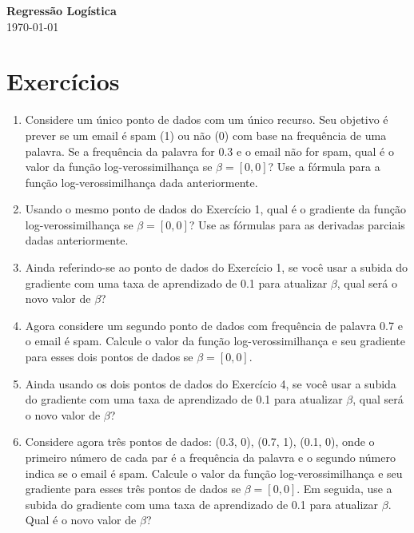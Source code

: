 \documentclass[12pt,a4paper, brazil]{article}
\begin{document}
\begin{center}
{\textbf {\huge Regressão Logística}}\\[5mm]
\today\\[5mm] %
\end{center}



\section{Exercícios}

\begin{enumerate}

\item Considere um único ponto de dados com um único recurso. Seu objetivo é prever se um email é spam (1) ou não (0) com base na frequência de uma palavra. Se a frequência da palavra for 0.3 e o email não for spam, qual é o valor da função log-verossimilhança se $\beta = [0, 0]$? Use a fórmula para a função log-verossimilhança dada anteriormente.

\item  Usando o mesmo ponto de dados do Exercício 1, qual é o gradiente da função log-verossimilhança se $\beta = [0, 0]$? Use as fórmulas para as derivadas parciais dadas anteriormente.

\item  Ainda referindo-se ao ponto de dados do Exercício 1, se você usar a subida do gradiente com uma taxa de aprendizado de 0.1 para atualizar $\beta$, qual será o novo valor de $\beta$?

\item Agora considere um segundo ponto de dados com frequência de palavra 0.7 e o email é spam. Calcule o valor da função log-verossimilhança e seu gradiente para esses dois pontos de dados se $\beta = [0, 0]$.

\item Ainda usando os dois pontos de dados do Exercício 4, se você usar a subida do gradiente com uma taxa de aprendizado de 0.1 para atualizar $\beta$, qual será o novo valor de $\beta$?

\item Considere agora três pontos de dados: (0.3, 0), (0.7, 1), (0.1, 0), onde o primeiro número de cada par é a frequência da palavra e o segundo número indica se o email é spam. Calcule o valor da função log-verossimilhança e seu gradiente para esses três pontos de dados se $\beta = [0, 0]$. Em seguida, use a subida do gradiente com uma taxa de aprendizado de 0.1 para atualizar $\beta$. Qual é o novo valor de $\beta$?

\end{enumerate}
\end{document}
